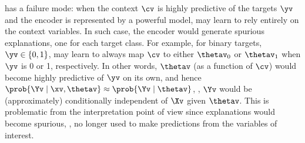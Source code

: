 \documentclass[twoside,11pt]{article}
\begin{document}
{\CEN} has a failure mode: when the context $\cv$ is highly predictive of the targets $\yv$ and the encoder is represented by a powerful model, {\CEN} may learn to rely entirely on the context variables.
In such case, the encoder would generate spurious explanations, one for each target class.
For example, for binary targets, $\yv \in \{0, 1\}$, {\CEN} may learn to always map $\cv$ to either $\thetav_0$ or $\thetav_1$ when $\yv$ is 0 or 1, respectively.
In other words, $\thetav$ (as a function of $\cv$) would become highly predictive of $\yv$ on its own, and hence $\prob{\Yv \mid \xv, \thetav} \approx \prob{\Yv \mid \thetav}$, \ie, $\Yv$ would be (approximately) conditionally independent of $\Xv$ given $\thetav$.
This is problematic from the interpretation point of view since explanations would become spurious, \ie, no longer used to make predictions from the variables of interest.
\end{document}
